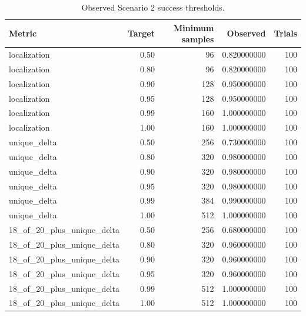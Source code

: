 \begin{table}[t]
\centering
\caption{Observed Scenario 2 success thresholds.}
\label{tab:s2-thresholds}
\begin{tabular}{lrrrr}
\toprule
Metric & Target & Minimum samples & Observed & Trials \\
\midrule
localization & 0.50 & 96 & 0.820000000 & 100 \\
localization & 0.80 & 96 & 0.820000000 & 100 \\
localization & 0.90 & 128 & 0.950000000 & 100 \\
localization & 0.95 & 128 & 0.950000000 & 100 \\
localization & 0.99 & 160 & 1.000000000 & 100 \\
localization & 1.00 & 160 & 1.000000000 & 100 \\
unique\_delta & 0.50 & 256 & 0.730000000 & 100 \\
unique\_delta & 0.80 & 320 & 0.980000000 & 100 \\
unique\_delta & 0.90 & 320 & 0.980000000 & 100 \\
unique\_delta & 0.95 & 320 & 0.980000000 & 100 \\
unique\_delta & 0.99 & 384 & 0.990000000 & 100 \\
unique\_delta & 1.00 & 512 & 1.000000000 & 100 \\
18\_of\_20\_plus\_unique\_delta & 0.50 & 256 & 0.680000000 & 100 \\
18\_of\_20\_plus\_unique\_delta & 0.80 & 320 & 0.960000000 & 100 \\
18\_of\_20\_plus\_unique\_delta & 0.90 & 320 & 0.960000000 & 100 \\
18\_of\_20\_plus\_unique\_delta & 0.95 & 320 & 0.960000000 & 100 \\
18\_of\_20\_plus\_unique\_delta & 0.99 & 512 & 1.000000000 & 100 \\
18\_of\_20\_plus\_unique\_delta & 1.00 & 512 & 1.000000000 & 100 \\
\bottomrule
\end{tabular}
\end{table}
